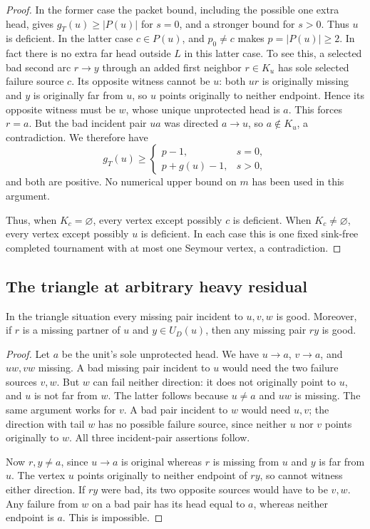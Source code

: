 \begin{proof}
In the former case the packet bound, including the possible one
extra head, gives $g_T(u)\ge|P(u)|$ for $s=0$, and a stronger bound
for $s>0$.  Thus $u$ is deficient.  In the latter case $c\in P(u)$,
and $p_0\ne c$ makes $p=|P(u)|\ge2$.  In fact there is no extra
far head outside $L$ in this latter case.  To see this, a selected
bad second arc $r\to y$ through an added first neighbor $r\in K_u$
has sole selected failure source $c$.  Its opposite witness cannot
be $u$: both $ur$ is originally missing and $y$ is originally far
from $u$, so $u$ points originally to neither endpoint.  Hence its
opposite witness must be $w$, whose unique unprotected head is $a$.
This forces $r=a$.  But the bad incident pair $ua$ was directed
$a\to u$, so $a\notin K_u$, a contradiction.  We therefore have
\[
 g_T(u)\ge
 \begin{cases}p-1,&s=0,\\p+g(u)-1,&s>0,\end{cases}
\]
and both are positive.  No numerical upper bound on $m$ has been
used in this argument.

Thus, when $K_c=\varnothing$, every vertex except possibly $c$ is
deficient.  When $K_c\ne\varnothing$, every vertex except possibly
$u$ is deficient.  In each case this is one fixed sink-free completed
tournament with at most one Seymour vertex, a contradiction.
\end{proof}

\subsection{The triangle at arbitrary heavy residual}

\begin{lemma}
\label{lem:triangle-keeper-pairs-good}
In the triangle situation every missing pair incident to $u,v,w$ is
good.  Moreover, if $r$ is a missing partner of $u$ and
$y\in U_D(u)$, then any missing pair $ry$ is good.
\end{lemma}
\begin{proof}
Let $a$ be the unit's sole unprotected head.  We have $u\to a$,
$v\to a$, and $uw,vw$ missing.  A bad missing pair incident to $u$
would need the two failure sources $v,w$.  But $w$ can fail neither
direction: it does not originally point to $u$, and $u$ is not
far from $w$.  The latter follows because $u\ne a$ and $uw$ is
missing.  The same argument works for $v$.  A bad pair incident to
$w$ would need $u,v$; the direction with tail $w$ has no possible
failure source, since neither $u$ nor $v$ points originally to $w$.
All three incident-pair assertions follow.

Now $r,y\ne a$, since $u\to a$ is original whereas $r$ is missing
from $u$ and $y$ is far from $u$.  The vertex $u$ points originally
to neither endpoint of $ry$, so cannot witness either direction.
If $ry$ were bad, its two opposite sources would have to be $v,w$.
Any failure from $w$ on a bad pair has its head equal to $a$,
whereas neither endpoint is $a$.  This is impossible.
\end{proof}

